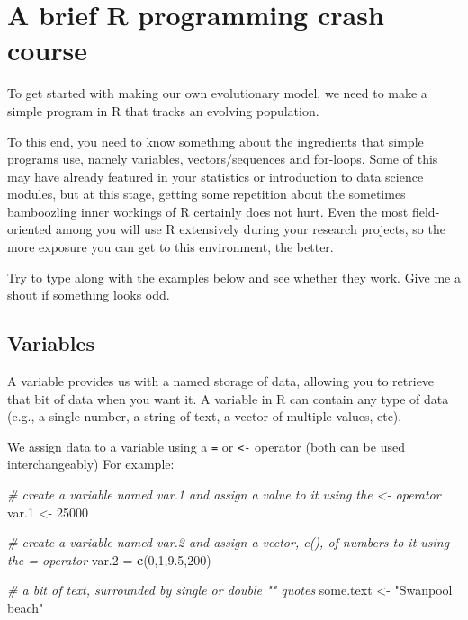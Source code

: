 \documentclass[
]{book}
\newenvironment{Shaded}{\begin{snugshade}}{\end{snugshade}}
\newcommand{\CommentTok}[1]{\textcolor[rgb]{0.56,0.35,0.01}{\textit{#1}}}
\newcommand{\DecValTok}[1]{\textcolor[rgb]{0.00,0.00,0.81}{#1}}
\newcommand{\FloatTok}[1]{\textcolor[rgb]{0.00,0.00,0.81}{#1}}
\newcommand{\FunctionTok}[1]{\textcolor[rgb]{0.13,0.29,0.53}{\textbf{#1}}}
\newcommand{\NormalTok}[1]{#1}
\newcommand{\OtherTok}[1]{\textcolor[rgb]{0.56,0.35,0.01}{#1}}
\newcommand{\StringTok}[1]{\textcolor[rgb]{0.31,0.60,0.02}{#1}}
\begin{document}
\chapter{A brief R programming crash course}\label{a-brief-r-programming-crash-course}

To get started with making our own evolutionary model, we need to make a simple program in R that tracks an evolving population.

To this end, you need to know something about the ingredients that simple programs use, namely variables, vectors/sequences and for-loops. Some of this may have already featured in your statistics or introduction to data science modules, but at this stage, getting some repetition about the sometimes bamboozling inner workings of R certainly does not hurt. Even the most field-oriented among you will use R extensively during your research projects, so the more exposure you can get to this environment, the better.

Try to type along with the examples below and see whether they work. Give me a shout if something looks odd.

\section{Variables}\label{variables}

A variable provides us with a named storage of data, allowing you to retrieve that bit of data when you want it. A variable in R can contain any type of data (e.g., a single number, a string of text, a vector of multiple values, etc).

We assign data to a variable using a \texttt{=} or \texttt{\textless{}-} operator (both can be used interchangeably) For example:

\begin{Shaded}
\begin{Highlighting}[]
\CommentTok{\# create a variable named var.1 and assign a value to it using the \textless{}{-} operator}
\NormalTok{var.1 }\OtherTok{\textless{}{-}} \DecValTok{25000}

\CommentTok{\# create a variable named var.2 and assign a vector, c(), of numbers to it using the = operator}
\NormalTok{var.2 }\OtherTok{=} \FunctionTok{c}\NormalTok{(}\DecValTok{0}\NormalTok{,}\DecValTok{1}\NormalTok{,}\FloatTok{9.5}\NormalTok{,}\DecValTok{200}\NormalTok{)}

\CommentTok{\# a bit of text, surrounded by single \textquotesingle{}\textquotesingle{} or double "" quotes}
\NormalTok{some.text }\OtherTok{\textless{}{-}} \StringTok{"Swanpool beach"}
\end{Highlighting}
\end{Shaded}
\end{document}

